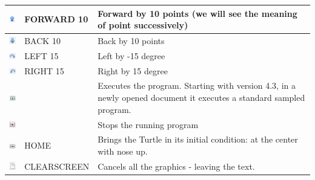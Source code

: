 \begin{center}
  \begin{tabular}{ c | l | p{5cm} }
    \hline
    \includegraphics[width=0.75cm]{./images/librelogo/FrecciaSULO.png} & FORWARD 10 & Forward by 10 points (we will see the meaning of point successively) \\ \hline
    \includegraphics[width=0.75cm]{./images/librelogo/FrecciagiuLO.png} & BACK 10 & Back by 10 points \\ \hline
    \includegraphics[width=0.75cm]{./images/librelogo/Orario.png} & LEFT 15 & Left by -15 degree \\ \hline
    \includegraphics[width=0.75cm]{./images/librelogo/Antiorario.png} & RIGHT 15 & Right by 15 degree \\ \hline
    \includegraphics[width=0.75cm]{./images/librelogo/PlayLO.png} &  & Executes the program. Starting with version 4.3, in a newly opened document it executes a standard sampled program. \\ \hline
    \includegraphics[width=0.75cm]{./images/librelogo/StopLO.png} &  & Stops the running program \\ \hline
    \includegraphics[width=0.75cm]{./images/librelogo/RewindLO.png} & HOME & Brings the Turtle in its initial condition: at the center with nose up. \\ \hline
    \includegraphics[width=0.75cm]{./images/librelogo/NewpageLO.png} & CLEARSCREEN & Cancels all the graphics - leaving the text. \\ \hline

\end{tabular}
\end{center}
